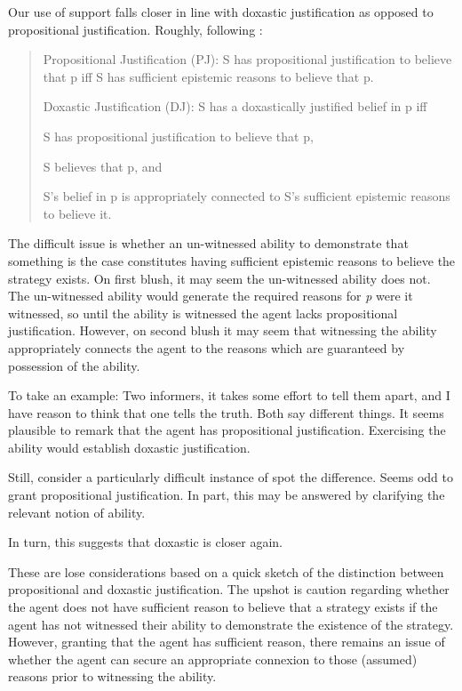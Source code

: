 \documentclass[10pt]{article}
\begin{document}
\begin{note}
  Our use of support falls closer in line with doxastic justification as opposed to propositional justification.
  Roughly, following \textcite{Silva:2020aa}:

  \begin{quote}
    Propositional Justification (PJ): S has propositional justification to believe that p iff S has sufficient epistemic reasons to believe that p.

    Doxastic Justification (DJ): S has a doxastically justified belief in p iff
    \begin{enumerate*}[label=(\roman*)]
    \item S has propositional justification to believe that p,
    \item S believes that p, and
    \item S’s belief in p is appropriately connected to S’s sufficient epistemic reasons to believe it.
    \end{enumerate*}
  \end{quote}
  The difficult issue is whether an un-witnessed ability to demonstrate that something is the case constitutes having sufficient epistemic reasons to believe the strategy exists.
  On first blush, it may seem the un-witnessed ability does not.
  The un-witnessed ability would generate the required reasons for \emph{p} were it witnessed, so until the ability is witnessed the agent lacks propositional justification.
  However, on second blush it may seem that witnessing the ability appropriately connects the agent to the reasons which are guaranteed by possession of the ability.

  To take an example:
  Two informers, it takes some effort to tell them apart, and I have reason to think that one tells the truth.
  Both say different things.
  It seems plausible to remark that the agent has propositional justification.
  Exercising the ability would establish doxastic justification.

  Still, consider a particularly difficult instance of spot the difference.
  Seems odd to grant propositional justification.
  In part, this may be answered by clarifying the relevant notion of ability.

  In turn, this suggests that doxastic is closer again.

  These are lose considerations based on a quick sketch of the distinction between propositional and doxastic justification.
  The upshot is caution regarding whether the agent does not have sufficient reason to believe that a strategy exists if the agent has not witnessed their ability to demonstrate the existence of the strategy.
  However, granting that the agent has sufficient reason, there remains an issue of whether the agent can secure an appropriate connexion to those (assumed) reasons prior to witnessing the ability.
\end{note}
\end{document}
